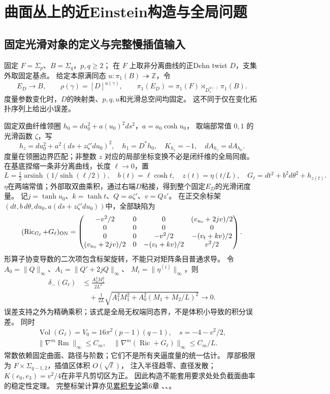 \documentclass[UTF8,a4paper,11pt,fontset=fandol]{ctexart}
\numberwithin{equation}{section}
\theoremstyle{definition}
\newcommand{\Ric}{\operatorname{Ric}}
\newcommand{\Rm}{\operatorname{Rm}}
\newcommand{\Vol}{\operatorname{Vol}}
\begin{document}
\section{曲面丛上的近Einstein构造与全局问题}
\subsection{固定光滑对象的定义与完整慢插值输入}
固定 $F=\Sigma_p$、$B=\Sigma_q$，$p,q\ge2$；
在 $F$ 上取非分离曲线的正Dehn twist $D$，支集外取固定基点。
给定本原满同态 $u:\pi_1(B)\twoheadrightarrow\mathbb Z$，令
\[
 E_D\longrightarrow B,\qquad
 \rho(\gamma)=[D]^{u(\gamma)},\qquad
 \pi_1(E_D)=\pi_1(F)\rtimes_{D_*^{u(\cdot)}}\pi_1(B).
\]
度量参数变化时，$D$的映射类、$p,q,u$和光滑总空间均固定。
这不同于仅在变化拓扑序列上给出小误差。

固定双曲纤维领圈
$h_0=du_0^2+a(u_0)^2ds^2$，$a=a_0\cosh u_0$，
取端部常值 $0,1$ 的光滑函数 $\zeta$，写
\[
 h_z=du_0^2+a^2(ds+z\zeta' du_0)^2,
 \quad h_1=D^*h_0,
 \quad K_{h_z}=-1,
 \quad dA_{h_z}=dA_{h_0}.
\]
度量在领圈边界匹配；非整数 $z$ 对应的局部坐标变换不必是闭纤维的全局同痕。
在基底捏缩一条非分离曲线，长度 $\ell\to0$，置
\[
 L=\tfrac12\operatorname{arsinh}(1/\sinh(\ell/2)),\quad
 b(t)=\ell\cosh t,\quad z(t)=\eta(t/L),\quad
 G_\ell=dt^2+b^2d\theta^2+h_{z(t)}.
\]
$\eta$在两端常值；外部取双曲乘积，通过右端$D$粘接，得到整个固定$E_D$的光滑闭度量。
记$j=\tanh u_0$、$k=\tanh t$、$Q=a\zeta'$、$v=Qz'$。
在正交余标架$(dt,b\,d\theta,du_0,a(ds+z\zeta'du_0))$中，全部缺陷为
\begin{equation}\label{eq:bundleRicci}
 (\Ric_{G_\ell}+G_\ell)_{\rm ON}=
 \begin{pmatrix}
 -v^2/2&0&0&(v_{u_0}+2jv)/2\\
 0&0&0&0\\
 0&0&-v^2/2&-(v_t+kv)/2\\
 (v_{u_0}+2jv)/2&0&-(v_t+kv)/2&v^2/2
 \end{pmatrix}.
\end{equation}
形算子协变导数的二次项包含标架旋转，不能只对矩阵条目普通求导。
令 $A_0=\|Q\|_\infty$、$A_1=\|Q'+2jQ\|_\infty$、
$M_i=\|\eta^{(i)}\|_\infty$，则
\begin{equation}\label{eq:bundlebound}
 \begin{aligned}
 \delta_-(G_\ell)&\le\frac{A_0^2M_1^2}{2L^2}\\
 &\quad+\frac1{2L}\sqrt{A_1^2M_1^2+A_0^2(M_1+M_2/L)^2}\longrightarrow0.
 \end{aligned}
\end{equation}
误差支持之外为精确乘积；该式是全局无权端同态界，不是体积小导致的积分误差。
同时
\[
 \begin{gathered}
 \Vol(G_\ell)=V_0=16\pi^2(p-1)(q-1),\quad
 s=-4-v^2/2,\\
 \|\nabla^m\Rm\|_\infty\le C_m,\quad
 \|\nabla^m(\Ric+G_\ell)\|_\infty\le C_m/L.
 \end{gathered}
\]
常数依赖固定曲面、路径与阶数；它们不是所有夹逼度量的统一估计。
厚部极限为 $F\times\Sigma_{q-1,2}$，插值区体积 $O(\sqrt\ell)$，
注入半径趋零、直径发散；$K(e_0,e_3)=v^2/4$在非平凡剪切区为正。
因此构造不能套用要求处处负截面曲率的稳定性定理。
完整标架计算亦见\href{20260912.tex}{累积专论}第6章
、、。
\end{document}
